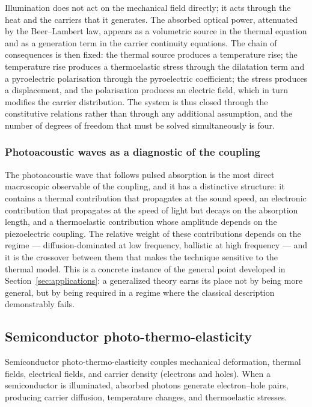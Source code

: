 Illumination does not act on the mechanical field directly; it acts through the heat and the carriers that it generates. The absorbed optical power, attenuated by the Beer--Lambert law, appears as a volumetric source in the thermal equation and as a generation term in the carrier continuity equations. The chain of consequences is then fixed: the thermal source produces a temperature rise; the temperature rise produces a thermoelastic stress through the dilatation term and a pyroelectric polarisation through the pyroelectric coefficient; the stress produces a displacement, and the polarisation produces an electric field, which in turn modifies the carrier distribution. The system is thus closed through the constitutive relations rather than through any additional assumption, and the number of degrees of freedom that must be solved simultaneously is four.

\subsubsection{Photoacoustic waves as a diagnostic of the coupling}

The photoacoustic wave that follows pulsed absorption is the most direct macroscopic observable of the coupling, and it has a distinctive structure: it contains a thermal contribution that propagates at the sound speed, an electronic contribution that propagates at the speed of light but decays on the absorption length, and a thermoelastic contribution whose amplitude depends on the piezoelectric coupling. The relative weight of these contributions depends on the regime --- diffusion-dominated at low frequency, ballistic at high frequency --- and it is the crossover between them that makes the technique sensitive to the thermal model. This is a concrete instance of the general point developed in Section~\ref{sec:applications}: a generalized theory earns its place not by being more general, but by being required in a regime where the classical description demonstrably fails.

\subsection{Semiconductor photo-thermo-elasticity}
\label{sec:5.6}

Semiconductor photo-thermo-elasticity couples mechanical deformation, thermal fields, electrical fields, and carrier density (electrons and holes). When a semiconductor is illuminated, absorbed photons generate electron--hole pairs, producing carrier diffusion, temperature changes, and thermoelastic stresses.

